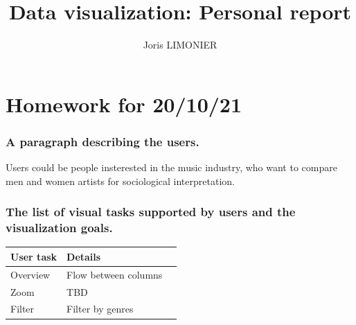\documentclass{article}
\title{Data visualization: Personal report}
\author{Joris LIMONIER}
\begin{document}
\maketitle

\tableofcontents

\section{Homework for 20/10/21}

\subsubsection*{A paragraph describing the users.}
Users could be people insterested in the music industry, who want to compare men and women artists for sociological interpretation.

\subsubsection*{The list of visual tasks supported by users and the visualization goals.}
\begin{center}
    \begin{tabular}{lll}
        \hline
        \multicolumn{1}{c}{\textbf{User task}} & \textbf{Details}     \\ \hline
        Overview                               & Flow between columns \\ \hline
        Zoom                                   & TBD                  \\ \hline
        Filter                                 & Filter by genres     \\
    \end{tabular}
\end{center}
\end{document}

